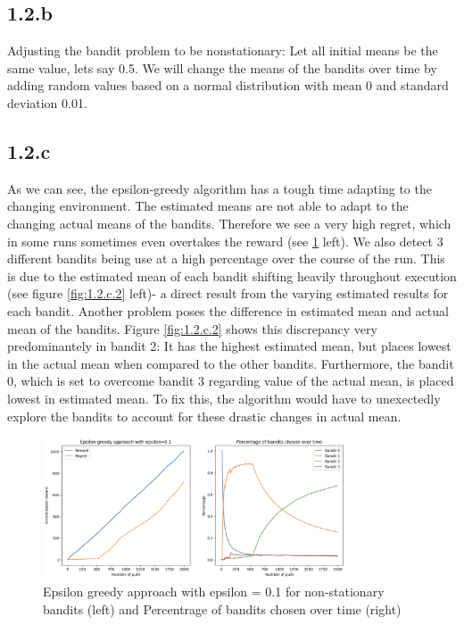 \documentclass{article} %
\begin{document}
	\subsection{1.2.b}
	Adjusting the bandit problem to be nonstationary: Let all initial means be the same value, lets say 0.5. We will change the means of the bandits over time by adding random values based on a normal distribution with mean 0 and standard deviation 0.01. 
	
	\subsection{1.2.c}
	
	As we can see, the epsilon-greedy algorithm has a tough time adapting to the changing environment. The estimated means are not able to adapt to the changing actual means of the bandits. Therefore we see a very high regret, which in some runs sometimes even overtakes the reward (see \ref{fig:1.2.c.1} left). We also detect 3 different bandits being use at a high percentage over the course of the run. This is due to the estimated mean of each bandit shifting heavily throughout execution (see figure \ref{fig:1.2.c.2} left)- a direct result from the varying estimated results for each bandit. Another problem poses the difference in estimated mean and actual mean of the bandits. Figure \ref{fig:1.2.c.2} shows this discrepancy very predominantely in bandit 2: It has the highest estimated mean, but places lowest in the actual mean when compared to the other bandits. Furthermore, the bandit 0, which is set to overcome bandit 3 regarding value of the actual mean, is placed lowest in estimated mean. To fix this, the algorithm would have to unexectedly explore the bandits to account for these drastic changes in actual mean. 
	
	\begin{figure}[h!]
		\centering
		\includegraphics[width=0.8\textwidth]{images/1.2.c.1}
		\caption{Epsilon greedy approach with epsilon = 0.1 for non-stationary bandits (left) and Percentrage of bandits chosen over time (right)}
		\label{fig:1.2.c.1}
		
	\end{figure}
	
\end{document}

